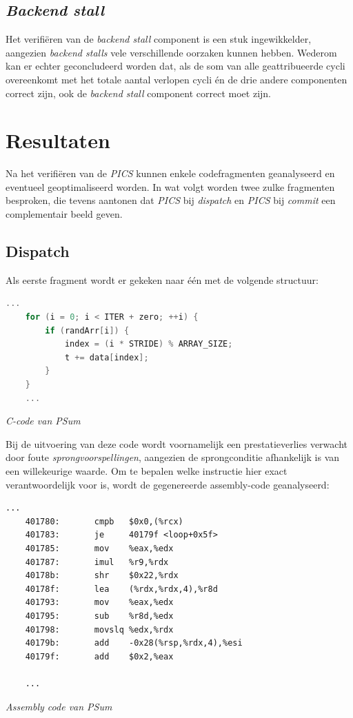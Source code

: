 \documentclass[12pt,a4paper,faculty=ea,language=nl]{ugent-doc}
\begin{document}
\subsection{\textit{Backend stall}}
Het verifiëren van de \textit{backend stall} component is een stuk ingewikkelder, aangezien \textit{backend stalls} vele verschillende oorzaken kunnen hebben. Wederom kan er echter geconcludeerd worden dat, als de som van alle geattribueerde cycli overeenkomt met het totale aantal verlopen cycli én de drie andere componenten correct zijn, ook de \textit{backend stall} component correct moet zijn.


\newpage
\section{Resultaten}
\label{sectie:resultaten}
Na het verifiëren van de \textit{PICS} kunnen enkele codefragmenten geanalyseerd en eventueel geoptimaliseerd worden. In wat volgt worden twee zulke fragmenten besproken, die tevens aantonen dat \textit{PICS} bij \textit{dispatch} en \textit{PICS} bij \textit{commit} een complementair beeld geven.
\subsection{Dispatch}
\label{dispatch}
Als eerste fragment wordt er gekeken naar één met de volgende structuur:
\begin{lstlisting}[language=C]
    ...
    for (i = 0; i < ITER + zero; ++i) {
        if (randArr[i]) {
            index = (i * STRIDE) % ARRAY_SIZE;
            t += data[index];
        }
    }
    ...
\end{lstlisting}
\vspace{-1em}
\hspace{5em}
\noindent\small\textit{C-code van PSum}

Bij de uitvoering van deze code wordt voornamelijk een prestatieverlies verwacht door foute \textit{sprongvoorspellingen}, aangezien de sprongconditie afhankelijk is van een willekeurige waarde. Om te bepalen welke instructie hier exact verantwoordelijk voor is, wordt de gegenereerde assembly-code geanalyseerd:
\begin{lstlisting}[morekeywords={cmpb,je,mov,imul,shr,lea,sub,movslq,add,cmp,jnz,rcx,edx,eax,r8d,rsp,esi,edi,r9,rdx}]
    ...
    401780:       cmpb   $0x0,(%rcx)
    401783:       je     40179f <loop+0x5f>
    401785:       mov    %eax,%edx
    401787:       imul   %r9,%rdx
    40178b:       shr    $0x22,%rdx
    40178f:       lea    (%rdx,%rdx,4),%r8d
    401793:       mov    %eax,%edx
    401795:       sub    %r8d,%edx
    401798:       movslq %edx,%rdx
    40179b:       add    -0x28(%rsp,%rdx,4),%esi
    40179f:       add    $0x2,%eax

    ...
\end{lstlisting}
\vspace{-1em}
\hspace{5em}
\noindent\small\textit{Assembly code van PSum}
\end{document}
